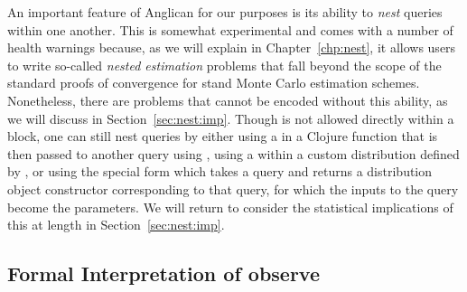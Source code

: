 An important feature of Anglican for our purposes is its ability to \emph{nest} queries within one another.  This
is somewhat experimental and comes with a number of health warnings because, as we will explain in Chapter~\ref{chp:nest},
it allows users to write so-called \emph{nested estimation} problems that fall beyond the scope of the standard
proofs of convergence for stand Monte Carlo estimation schemes. Nonetheless, there are problems that cannot
be encoded without this ability, as we will discuss in Section~\ref{sec:nest:imp}.
Though \doquery is not allowed directly within a  block, one can still nest queries by 
either using a \doquery in a Clojure function that is then passed to another query using {\small {}},
using a \doquery within a custom distribution defined by , or using the special form \conditional which
takes a query and returns a distribution object constructor corresponding to that query, 
for which the inputs to the query become the parameters.
We will return to consider the statistical implications of this at length in Section~\ref{sec:nest:imp}.

\subsection{Formal Interpretation of observe}
\label{sec:probprog:anglican:observe}

